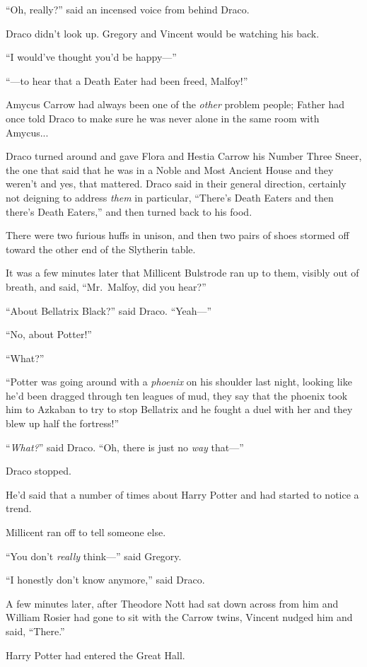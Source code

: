 “Oh, really?” said an incensed voice from behind Draco.

Draco didn’t look up. Gregory and Vincent would be watching his back.

“I would’ve thought you’d be happy—”

“—to hear that a Death Eater had been freed, Malfoy!”

Amycus Carrow had always been one of the \emph{other} problem people; Father had once told Draco to make sure he was never alone in the same room with Amycus...

Draco turned around and gave Flora and Hestia Carrow his Number Three Sneer, the one that said that he was in a Noble and Most Ancient House and they weren’t and yes, that mattered. Draco said in their general direction, certainly not deigning to address \emph{them} in particular, “There’s Death Eaters and then there’s Death Eaters,” and then turned back to his food.

There were two furious huffs in unison, and then two pairs of shoes stormed off toward the other end of the Slytherin table.

It was a few minutes later that Millicent Bulstrode ran up to them, visibly out of breath, and said, “Mr.~Malfoy, did you hear?”

“About Bellatrix Black?” said Draco. “Yeah—”

“No, about Potter!”

“What?”

“Potter was going around with a \emph{phoenix} on his shoulder last night, looking like he’d been dragged through ten leagues of mud, they say that the phoenix took him to Azkaban to try to stop Bellatrix and he fought a duel with her and they blew up half the fortress!”

“\emph{What?}” said Draco. “Oh, there is just no \emph{way} that—”

Draco stopped.

He’d said that a number of times about Harry Potter and had started to notice a trend.

Millicent ran off to tell someone else.

“You don’t \emph{really} think—” said Gregory.

“I honestly don’t know anymore,” said Draco.

A few minutes later, after Theodore Nott had sat down across from him and William Rosier had gone to sit with the Carrow twins, Vincent nudged him and said, “There.”

Harry Potter had entered the Great Hall.

